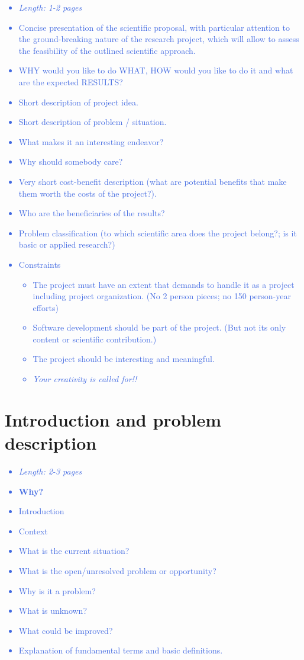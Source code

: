 \documentclass[a4paper,11pt]{article}
\providecommand*{\note}[1]{\small \textcolor{RoyalBlue}{\begin{minipage}{\textwidth}{#1}\end{minipage}}}
\begin{document}
\note{
\begin{itemize}
	\item {\em Length: 1-2 pages}
	\item Concise presentation of the scientific proposal, with particular attention to the ground-breaking nature of the research project, which will allow to assess the feasibility of the outlined scientific approach. 
	\item WHY would you like to do WHAT, HOW would you like to do it and what are the expected RESULTS?
	\item Short description of project idea.
	\item Short description of problem / situation.
	\item What makes it an interesting endeavor?
	\item Why should somebody care?
	\item Very short cost-benefit description (what are potential benefits that make them worth the costs of the project?).
	\item Who are the beneficiaries of the results?
	\item Problem classification (to which scientific area does the project belong?; is it basic or applied research?)
	\item Constraints
	\begin{itemize}
		\item     The project must have an extent that demands to handle it as a project including project organization.  (No 2 person pieces; no 150 person-year efforts)
		\item     Software development should be part of the project. (But not its only content or scientific contribution.)
		\item     The project should be interesting and meaningful.
		\item     {\em Your creativity is called for!!}
	\end{itemize}
\end{itemize}
}

\section{Introduction and problem description}
\label{sect:intro}

\note{
\begin{itemize}
	\item {\em Length: 2-3 pages}
	\item {\bf Why?}
	\item Introduction
	\item Context
	\item What is the current situation?
	\item What is the open/unresolved problem or opportunity?
	\item Why is it a problem?
	\item What is unknown?
	\item What could be improved?
	\item Explanation of fundamental terms and basic definitions.
\end{itemize}
}
\end{document}
